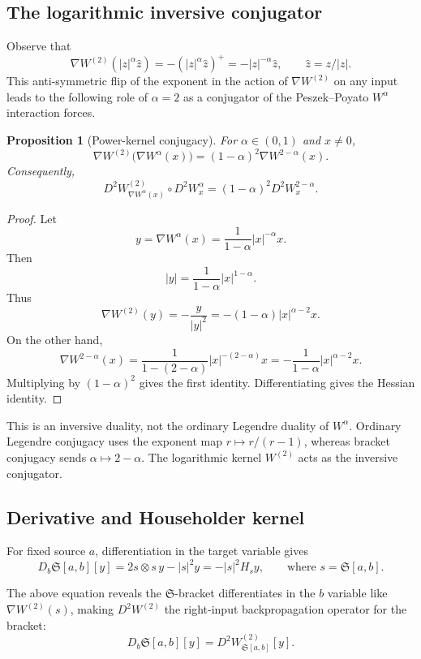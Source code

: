 \documentclass[11pt]{article}
\newtheorem{proposition}[theorem]{Proposition}
\newcommand{\norm}[1]{\left|#1\right|}
\newcommand{\grad}{\nabla}
\newcommand{\Hh}{ H}
\newcommand{\Sbr}[2]{\mathfrak S[#1,#2]}
\begin{document}
\subsection{The logarithmic inversive conjugator}

Observe that
\[
    \grad W^{(2)}(|z|^{\alpha}\hat z)=-(|z|^{\alpha}\hat z)^+=-|z|^{-\alpha}\hat z,\qquad \hat z=z/|z|.
\]
This anti-symmetric flip of the exponent in the action of $\grad W^{(2)}$ on any input leads to the following role of $\alpha{=}2$ as a conjugator of the Peszek--Poyato $W^\alpha$ interaction forces.

\begin{proposition}[Power-kernel conjugacy]
For $\alpha\in(0,1)$ and $x\neq0$,
\[
    \boxed{
    \grad W^{(2)}\bigl(\grad W^\alpha(x)\bigr)
    =(1-\alpha)^2\grad W^{2-\alpha}(x).
    }
\]
Consequently,
\[
    \boxed{
    D^2W^{(2)}_{\grad W^\alpha(x)}\circ D^2W^\alpha_x
    =(1-\alpha)^2D^2W^{2-\alpha}_x.
    }
\]
\end{proposition}

\begin{proof}
Let
\[
    y=\grad W^\alpha(x)=\frac{1}{1-\alpha}\norm x^{-\alpha}x.
\]
Then
\[
    \norm y=\frac{1}{1-\alpha}\norm x^{1-\alpha}.
\]
Thus
\[
    \grad W^{(2)}(y)
    =-\frac{y}{\norm y^2}
    =-(1-\alpha)\norm x^{\alpha-2}x.
\]
On the other hand,
\[
    \grad W^{2-\alpha}(x)
    =\frac{1}{1-(2-\alpha)}\norm x^{-(2-\alpha)}x
    =-\frac{1}{1-\alpha}\norm x^{\alpha-2}x.
\]
Multiplying by $(1-\alpha)^2$ gives the first identity.  Differentiating gives the Hessian identity.
\end{proof}

This is an inversive duality, not the ordinary Legendre duality of $W^\alpha$.  Ordinary Legendre conjugacy uses the exponent map $r\mapsto r/(r-1)$, whereas bracket conjugacy sends $\alpha\mapsto2-\alpha$.  The logarithmic kernel $W^{(2)}$ acts as the inversive conjugator.


\subsection{Derivative and Householder kernel}

For fixed source $a$, differentiation in the target variable gives
\[
    D_b\Sbr{a}{b}[y]
    =2s\otimes s\,y-\norm s^2 y=-\norm s^2\Hh_s y,
    \qquad \text{where }s=\Sbr{a}{b}.
\]

The above equation reveals the $\mathfrak{S}$-bracket differentiates in the $b$ variable like $\nabla W^{(2)}(s)$, making $D^2W^{(2)}$ the right-input backpropagation operator for the bracket:
\begin{equation}
    \boxed{
    D_b\Sbr{a}{b}[y]=D^2W^{(2)}_{\Sbr{a}{b}}[y].
    }
    \label{eq:fixed-source-hessian}
\end{equation}
\end{document}
